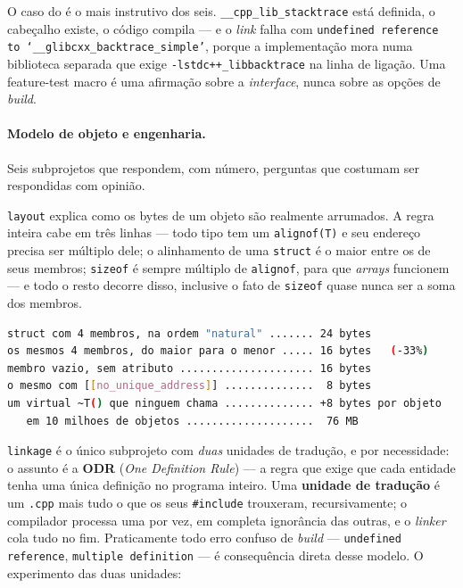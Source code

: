 \begin{armadilha}
O caso do  é o mais instrutivo dos seis.
\texttt{\_\_cpp\_lib\_stacktrace} está definida, o cabeçalho existe, o código
compila --- e o \emph{link} falha com \texttt{undefined reference to
`\_\_glibcxx\_backtrace\_simple'}, porque a implementação mora numa biblioteca
separada que exige \texttt{-lstdc++\_libbacktrace} na linha de ligação. Uma
feature-test macro é uma afirmação sobre a \emph{interface}, nunca sobre as
opções de \emph{build}.
\end{armadilha}

\paragraph{Modelo de objeto e engenharia.}
Seis subprojetos que respondem, com número, perguntas que costumam ser
respondidas com opinião.

\texttt{layout} explica como os bytes de um objeto são realmente arrumados. A
regra inteira cabe em três linhas --- todo tipo tem um \texttt{alignof(T)} e seu
endereço precisa ser múltiplo dele; o alinhamento de uma \texttt{struct} é o
maior entre os de seus membros; \texttt{sizeof} é sempre múltiplo de
\texttt{alignof}, para que \emph{arrays} funcionem --- e todo o resto decorre
disso, inclusive o fato de \texttt{sizeof} quase nunca ser a soma dos membros.

\begin{lstlisting}[style=bt, language=bash,
    caption={Saída de \texttt{src/layout/}: o que se ganha reordenando membros e
             o que custa um destrutor virtual.}]
struct com 4 membros, na ordem "natural" ....... 24 bytes
os mesmos 4 membros, do maior para o menor ..... 16 bytes   (-33%)
membro vazio, sem atributo ..................... 16 bytes
o mesmo com [[no_unique_address]] ..............  8 bytes
um virtual ~T() que ninguem chama .............. +8 bytes por objeto
   em 10 milhoes de objetos ....................  76 MB
\end{lstlisting}

\texttt{linkage} é o único subprojeto com \emph{duas} unidades de tradução, e
por necessidade: o assunto é a \textbf{ODR} (\emph{One Definition Rule}) --- a regra que exige que cada entidade
tenha uma única definição no programa inteiro. Uma \textbf{unidade de tradução}
é um \texttt{.cpp} mais tudo o que os seus \texttt{\#include} trouxeram,
recursivamente; o compilador processa uma por vez, em completa ignorância das
outras, e o \emph{linker} cola tudo no fim. Praticamente todo erro confuso de
\emph{build} --- \texttt{undefined reference}, \texttt{multiple definition} ---
é consequência direta desse modelo. O experimento das duas unidades:

